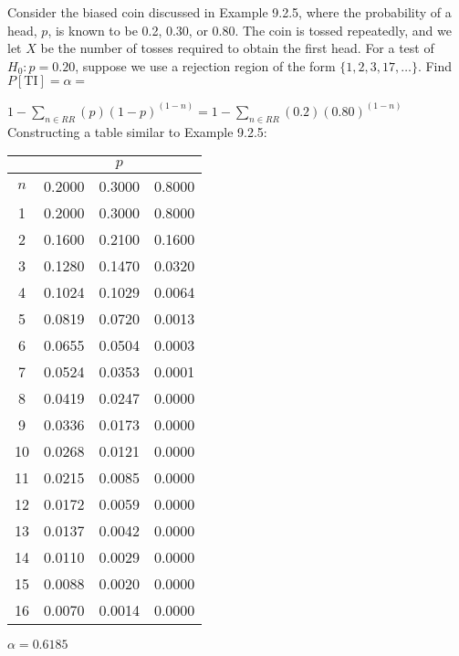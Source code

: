 \documentclass[answers]{exam}
\begin{document}
\begin{questions}
\clearpage

\question 
Consider the biased coin discussed in Example 9.2.5, 
where the probability of a head, \(p\), is known to be 0.2, 0.30, or 0.80. 
The coin is tossed repeatedly, and we let \(X\) be the 
number of tosses required to obtain the first head. For a test of
\(H_0 : p=0.20\), suppose we use a rejection region of the form
\(\{1,2,3,17,\ldots\}\). Find \(P[\text{TI}]=\alpha=\)
\begin{solution}
	\(1-\sum_{n\in RR}(p)(1-p)^{(1-n)} = 1-\sum_{n\in RR}(0.2)(0.80)^{(1-n)}\) \\
	
	Constructing a table similar to Example 9.2.5: \\
	\begin{center}
		\begin{tabular}{c|rrr}
			& \multicolumn{3}{c}{\(p\)} \\ \toprule
			\(n\) & 0.2000 & 0.3000 &  0.8000 \\ \midrule
			1   & 0.2000 & 0.3000 &  0.8000 \\
			2   & 0.1600 & 0.2100 &  0.1600 \\
			3   & 0.1280 & 0.1470 &  0.0320 \\
			4   & 0.1024 & 0.1029 &  0.0064 \\
			5   & 0.0819 & 0.0720 &  0.0013 \\
			6   & 0.0655 & 0.0504 &  0.0003 \\
			7   & 0.0524 & 0.0353 &  0.0001 \\
			8   & 0.0419 & 0.0247 &  0.0000 \\
			9   & 0.0336 & 0.0173 &  0.0000 \\
			10   & 0.0268 & 0.0121 &  0.0000 \\
			11   & 0.0215 & 0.0085 &  0.0000 \\
			12   & 0.0172 & 0.0059 &  0.0000 \\
			13   & 0.0137 & 0.0042 &  0.0000 \\
			14   & 0.0110 & 0.0029 &  0.0000 \\
			15   & 0.0088 & 0.0020 &  0.0000 \\
			16   & 0.0070 & 0.0014 &  0.0000 \\ \bottomrule
		\end{tabular}
	\end{center}

	\(\alpha=0.6185\)


\end{solution}
\end{questions}
\end{document}
